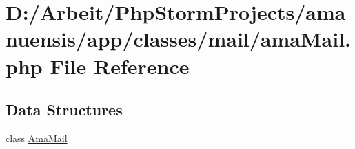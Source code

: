 \hypertarget{a00092}{}\section{D\+:/\+Arbeit/\+Php\+Storm\+Projects/amanuensis/app/classes/mail/ama\+Mail.php File Reference}
\label{a00092}
\subsection*{Data Structures}
\begin{DoxyCompactItemize}
\item 
class \hyperlink{a00006}{Ama\+Mail}
\end{DoxyCompactItemize}
